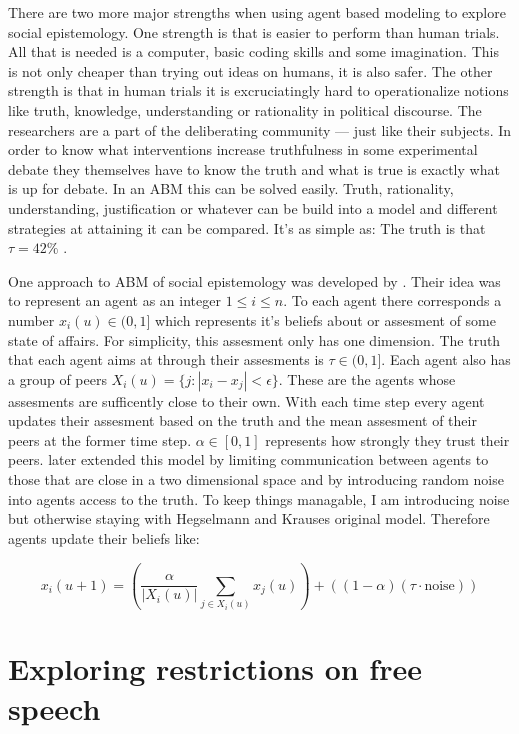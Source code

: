 \documentclass{essay-formal}
\begin{document}
There are two more major strengths when using agent based modeling to explore social epistemology. One strength is that is easier to perform than human trials. All that is needed is a computer, basic coding skills and some imagination. This is not only cheaper than trying out ideas on humans, it is also safer. The other strength is that in human trials it is excruciatingly hard to operationalize notions like truth, knowledge, understanding or rationality in political discourse. The researchers are a part of the deliberating community --- just like their subjects. In order to know what interventions increase truthfulness in some experimental debate they themselves have to know the truth and what is true is exactly what is up for debate. In an ABM this can be solved easily. Truth, rationality, understanding, justification or whatever can be build into a model and different strategies at attaining it can be compared. It's as simple as: The truth is that $\tau = 42\%$ \parencite{shugars2021}.

One approach to ABM of social epistemology was developed by \cite{hegselmann2009}. Their idea was to represent an agent as an integer $1 \leq i \leq n$. To each agent there corresponds a number $x_i(u) \in (0, 1]$ which represents it's beliefs about or assesment of some state of affairs. For simplicity, this assesment only has one dimension. The truth that each agent aims at through their assesments is $\tau \in (0, 1]$. Each agent also has a group of peers $X_i(u) = \{j: |x_i - x_j| < \epsilon\}$. These are the agents whose assesments are sufficently close to their own. With each time step every agent updates their assesment based on the truth and the mean assesment of their peers at the former time step. $\alpha \in [0, 1]$ represents how strongly they trust their peers. \textcite{riegler2010} later extended this model by limiting communication between agents to those that are close in a two dimensional space and by introducing random noise into agents access to the truth. To keep things managable, I am introducing noise but otherwise staying with Hegselmann and Krauses original model. Therefore agents update their beliefs like:

\[ x_i(u + 1) = \left( \frac{\alpha}{|X_i(u)|} \sum_{j \in X_i(u)} x_j(u) \right) + \left( (1-\alpha)(\tau \cdot \text{noise}) \right) \]

\section{Exploring restrictions on free speech}
\end{document}
